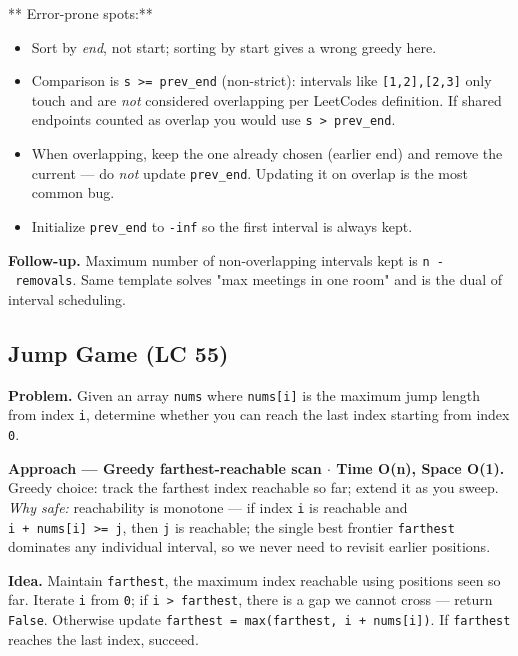 \documentclass[11pt]{article}
\providecommand{\tightlist}{\setlength{\itemsep}{1pt}\setlength{\parskip}{0pt}}
\begin{document}
** Error-prone spots:**

\begin{itemize}
\tightlist
\item
  Sort by \emph{end}, not start; sorting by start gives a wrong greedy here.
\item
  Comparison is \texttt{s\ \textgreater{}=\ prev\_end} (non-strict): intervals like \texttt{{[}1,2{]},{[}2,3{]}} only touch and are \emph{not} considered overlapping per LeetCode\textquotesingle s definition. If shared endpoints counted as overlap you would use \texttt{s\ \textgreater{}\ prev\_end}.
\item
  When overlapping, keep the one already chosen (earlier end) and remove the current --- do \emph{not} update \texttt{prev\_end}. Updating it on overlap is the most common bug.
\item
  Initialize \texttt{prev\_end} to \texttt{-inf} so the first interval is always kept.
\end{itemize}

\textbf{Follow-up.} Maximum number of non-overlapping intervals kept is \texttt{n\ -\ removals}. Same template solves "max meetings in one room" and is the dual of interval scheduling.

\subsection{Jump Game (LC 55)}\label{jump-game-lc-55}

\textbf{Problem.} Given an array \texttt{nums} where \texttt{nums{[}i{]}} is the maximum jump length from index \texttt{i}, determine whether you can reach the last index starting from index \texttt{0}.

\textbf{Approach --- Greedy farthest-reachable scan \(\cdot\) Time O(n), Space O(1).} Greedy choice: track the farthest index reachable so far; extend it as you sweep. \emph{Why safe:} reachability is monotone --- if index \texttt{i} is reachable and \texttt{i\ +\ nums{[}i{]}\ \textgreater{}=\ j}, then \texttt{j} is reachable; the single best frontier \texttt{farthest} dominates any individual interval, so we never need to revisit earlier positions.

\textbf{Idea.} Maintain \texttt{farthest}, the maximum index reachable using positions seen so far. Iterate \texttt{i} from \texttt{0}; if \texttt{i\ \textgreater{}\ farthest}, there is a gap we cannot cross --- return \texttt{False}. Otherwise update \texttt{farthest\ =\ max(farthest,\ i\ +\ nums{[}i{]})}. If \texttt{farthest} reaches the last index, succeed.
\end{document}
